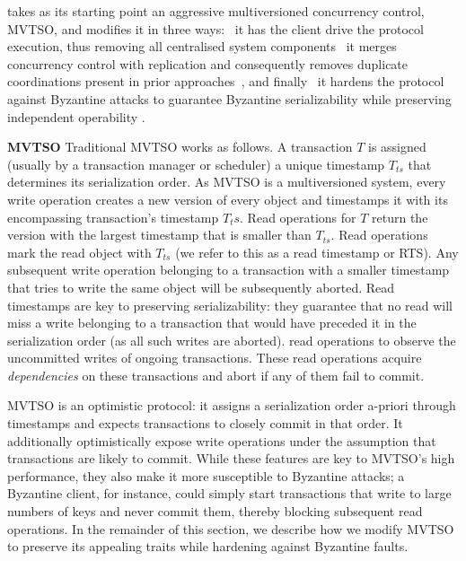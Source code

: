 \sys{} takes as its starting point an aggressive multiversioned concurrency control,
MVTSO, and modifies it in three ways: \one~it has the client drive the protocol execution,
thus removing all centralised system components \two~it merges concurrency control
with replication and consequently removes duplicate coordinations present in prior approaches~\cite{}, and finally \three~it hardens the protocol against Byzantine attacks to guarantee Byzantine serializability while preserving independent operability  .

\par \textbf{MVTSO} Traditional MVTSO works as follows. A transaction $T$ is assigned (usually by a transaction manager or scheduler) a unique timestamp $T_{ts}$ that determines its serialization order. As MVTSO is a multiversioned system, every write operation creates a new version of every object and timestamps it with its encompassing transaction's timestamp $T_ts$. Read operations for $T$ return the version with the largest timestamp that is smaller than $T_{ts}$. Read operations mark the read object with $T_{ts}$ (we refer to this as a read timestamp or RTS). Any subsequent write operation belonging to a transaction with a smaller timestamp that tries to write the same object will be subsequently aborted. Read timestamps are key to preserving serializability: they guarantee that no read will miss a write belonging to a transaction that would have preceded it in the serialization order (as all such writes are aborted).  read operations to observe the uncommitted writes of ongoing transactions. These read operations acquire \textit{dependencies} on these  transactions and abort if any of them fail to commit.   


MVTSO is an optimistic protocol: it assigns a serialization order a-priori through timestamps and expects transactions to closely commit in that order. It additionally optimistically expose write operations under the assumption that transactions are likely to commit. While these features are key to MVTSO's high performance, they also make it more susceptible to Byzantine attacks; a Byzantine client, for instance, could simply start transactions that write to large numbers of keys and never
commit them, thereby blocking subsequent read operations. In the remainder of this section, we describe how we modify MVTSO to preserve its appealing traits while hardening against Byzantine faults.

